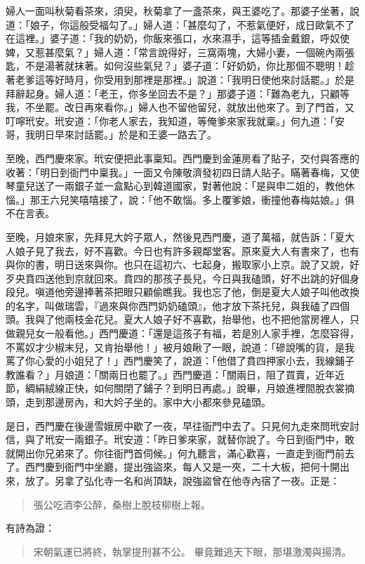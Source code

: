 婦人一面叫秋菊看茶來，須臾，秋菊拿了一盞茶來，與王婆吃了。那婆子坐著，說道：「娘子，你這般受福勾了。」婦人道：「甚麼勾了，不惹氣便好，成日歐氣不了在這裡。」婆子道：「我的奶奶，你飯來張口，水來濕手，這等插金戴銀，呼奴使婢，又惹甚麼氣？」婦人道：「常言說得好，三窩兩塊，大婦小妻，一個碗內兩張匙，不是湯著就抹著。如何沒些氣兒？」婆子道：「好奶奶，你比那個不聰明！趁著老爹這等好時月，你受用到那裡是那裡。」說道：「我明日使他來討話罷。」於是拜辭起身。婦人道：「老王，你多坐回去不是？」那婆子道：「難為老九，只顧等我，不坐罷。改日再來看你。」婦人也不留他留兒，就放出他來了。到了門首，又叮嚀玳安。玳安道：「你老人家去，我知道，等俺爹來家我就稟。」何九道：「安哥，我明日早來討話罷。」於是和王婆一路去了。

至晚，西門慶來家。玳安便把此事稟知。西門慶到金蓮房看了貼子，交付與答應的收著：「明日到衙門中稟我。」一面又令陳敬濟發初四日請人貼子。瞞著春梅，又使琴童兒送了一兩銀子並一盒點心到韓道國家，對著他說：「是與申二姐的，教他休惱。」那王六兒笑嘻嘻接了，說：「他不敢惱。多上覆爹娘，衝撞他春梅姑娘。」俱不在言表。

至晚，月娘來家，先拜見大妗子眾人，然後見西門慶，道了萬福，就告訴：「夏大人娘子見了我去，好不喜歡。今日也有許多親鄰堂客。原來夏大人有書來了，也有與你的書，明日送來與你。也只在這初六、七起身，搬取家小上京。說了又說，好歹央賁四送他到京就回來。賁四的那孩子長兒，今日與我磕頭，好不出跳的好個身段兒。嗔道他旁邊捧著茶把眼只顧偷瞧我。我也忘了他，倒是夏大人娘子叫他改換的名字，叫做瑞雲，『過來與你西門奶奶磕頭』，他才放下茶托兒，與我磕了四個頭。我與了他兩枝金花兒。夏大人娘子好不喜歡，抬舉他，也不把他當房裡人，只做親兒女一般看他。」西門慶道：「還是這孩子有福，若是別人家手裡，怎麼容得，不罵奴才少椒末兒，又肯抬舉他！」被月娘瞅了一眼，說道：「磣說嘴的貨，是我罵了你心愛的小姐兒了！」西門慶笑了，說道：「他借了賁四押家小去，我線鋪子教誰看？」月娘道：「關兩日也罷了。」西門慶道：「關兩日，阻了買賣，近年近節，綢絹絨線正快，如何關閉了鋪子？到明日再處。」說畢，月娘進裡間脫衣裳摘頭，走到那邊房內，和大妗子坐的。家中大小都來參見磕頭。

是日，西門慶在後邊雪娥房中歇了一夜，早往衙門中去了。只見何九走來問玳安討信，與了玳安一兩銀子。玳安道：「昨日爹來家，就替你說了。今日到衙門中，敢就開出你兄弟來了。你往衙門首伺候。」何九聽言，滿心歡喜，一直走到衙門前去了。西門慶到衙門中坐廳，提出強盜來，每人又是一夾，二十大板，把何十開出來，放了。另拿了弘化寺一名和尚頂缺，說強盜曾在他寺內宿了一夜。正是：
\begin{quote}
張公吃酒李公醉，桑樹上脫枝柳樹上報。
\end{quote}
有詩為證：
\begin{quote}
宋朝氣運已將終，執掌提刑甚不公。
畢竟難逃天下眼，那堪激濁與揚清。
\end{quote}

